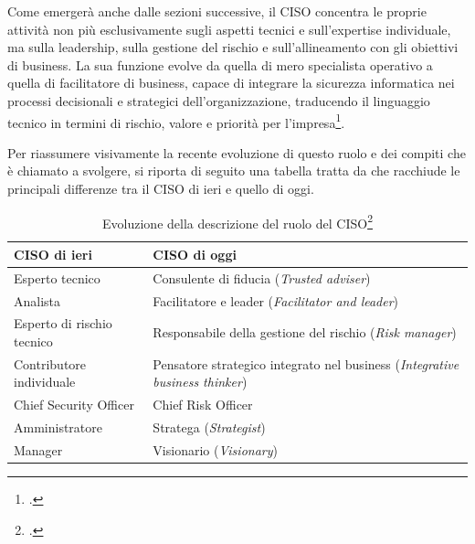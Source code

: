 Come emergerà anche dalle sezioni successive, il CISO concentra le proprie attività non più esclusivamente sugli aspetti tecnici 
e sull’expertise individuale, ma sulla leadership, sulla gestione del rischio e sull’allineamento con gli obiettivi di business. 
La sua funzione evolve da quella di mero specialista operativo a quella di facilitatore di business, capace di integrare la sicurezza 
informatica nei processi decisionali e strategici dell’organizzazione, traducendo il linguaggio tecnico in termini di rischio, 
valore e priorità per l’impresa\footcite[pp. 32--34]{kouns-ciso}.

Per riassumere visivamente la recente evoluzione di questo ruolo e dei compiti che è chiamato a svolgere, si riporta
di seguito una tabella tratta da \cite{kouns-ciso} che racchiude le principali differenze tra il CISO di ieri e quello di oggi.

\begin{table}[H]
\centering
\renewcommand{\arraystretch}{1.5}
\caption{Evoluzione della descrizione del ruolo del CISO\footcite[Tab. 1]{kouns-ciso}}
\begin{tabular}{p{7cm} p{7cm}}
\toprule
\textbf{CISO di ieri} & \textbf{CISO di oggi} \\
\midrule
Esperto tecnico & Consulente di fiducia (\textit{Trusted adviser}) \\
Analista & Facilitatore e leader (\textit{Facilitator and leader}) \\
Esperto di rischio tecnico & Responsabile della gestione del rischio (\textit{Risk manager}) \\
Contributore individuale & Pensatore strategico integrato nel business (\textit{Integrative business thinker}) \\
Chief Security Officer & Chief Risk Officer \\
Amministratore & Stratega (\textit{Strategist}) \\
Manager & Visionario (\textit{Visionary}) \\
\bottomrule
\end{tabular}
\end{table}



